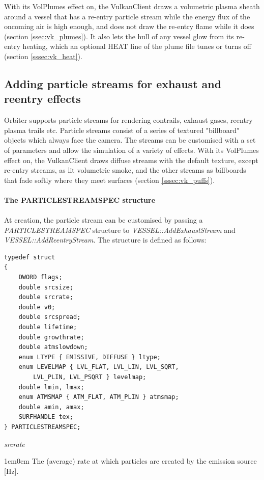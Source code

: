 \documentclass[Orbiter Developer Manual.tex]{subfiles}
\begin{document}
\noindent
With its VolPlumes effect on, the VulkanClient draws a volumetric plasma sheath around a vessel that has a re-entry particle stream while the energy flux of the oncoming air is high enough, and does not draw the re-entry flame while it does (section \ref{ssec:vk_plumes}). It also lets the hull of any vessel glow from its re-entry heating, which an optional HEAT line of the plume file tunes or turns off (section \ref{sssec:vk_heat}).


\subsection{Adding particle streams for exhaust and reentry effects}
Orbiter supports particle streams for rendering contrails, exhaust gases, reentry plasma trails etc. Particle streams consist of a series of textured "billboard" objects which always face the camera. The streams can be customised with a set of parameters and allow the simulation of a variety of effects. With its VolPlumes effect on, the VulkanClient draws diffuse streams with the default texture, except re-entry streams, as lit volumetric smoke, and the other streams as billboards that fade softly where they meet surfaces (section \ref{sssec:vk_puffs}).\\
\\
\textbf{The PARTICLESTREAMSPEC structure}\\
\\
At creation, the particle stream can be customised by passing a \textit{PARTICLESTREAMSPEC} structure to \textit{VESSEL::AddExhaustStream} and \textit{VESSEL::AddReentryStream}. The structure is defined as follows:

\begin{lstlisting}
typedef struct
{
	DWORD flags;
	double srcsize;
	double srcrate;
	double v0;
	double srcspread;
	double lifetime;
	double growthrate;
	double atmslowdown;
	enum LTYPE { EMISSIVE, DIFFUSE } ltype;
	enum LEVELMAP { LVL_FLAT, LVL_LIN, LVL_SQRT,
		LVL_PLIN, LVL_PSQRT } levelmap;
	double lmin, lmax;
	enum ATMSMAP { ATM_FLAT, ATM_PLIN } atmsmap;
	double amin, amax;
	SURFHANDLE tex;
} PARTICLESTREAMSPEC;
\end{lstlisting}

\noindent
\textit{srcrate}
\begin{adjustwidth}{1cm}{0cm}
The (average) rate at which particles are created by the emission source [Hz].
\\
\end{adjustwidth}
\end{document}
